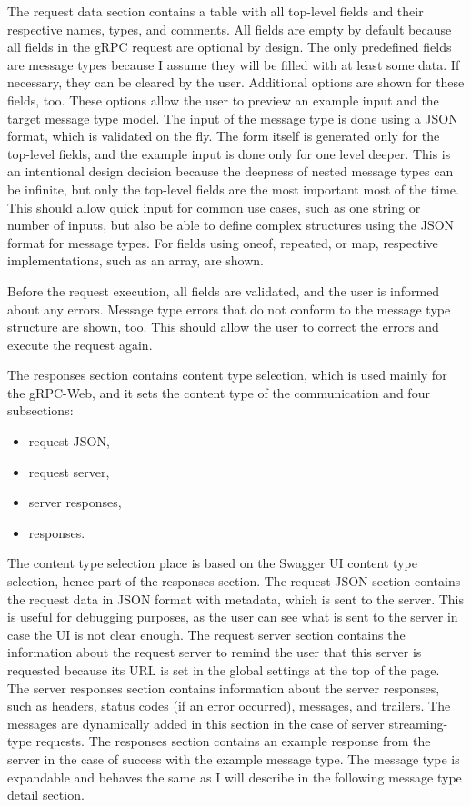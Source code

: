 The request data section contains a table with all top-level fields and their respective names, types, and comments.
All fields are empty by default because all fields in the gRPC request are optional by design.
The only predefined fields are message types because I assume they will be filled with at least some data.
If necessary, they can be cleared by the user.
Additional options are shown for these fields, too.
These options allow the user to preview an example input and the target message type model.
The input of the message type is done using a JSON format, which is validated on the fly.
The form itself is generated only for the top-level fields, and the example input is done only for one level deeper.
This is an intentional design decision because the deepness of nested message types can be infinite, but only the top-level fields are the most important most of the time.
This should allow quick input for common use cases, such as one string or number of inputs, but also be able to define complex structures using the JSON format for message types.
For fields using oneof, repeated, or map, respective implementations, such as an array, are shown.

Before the request execution, all fields are validated, and the user is informed about any errors.
Message type errors that do not conform to the message type structure are shown, too.
This should allow the user to correct the errors and execute the request again.

The responses section contains content type selection, which is used mainly for the gRPC-Web, and it sets the content type of the communication and four subsections:
\begin{itemize}
    \item request JSON,
    \item request server,
    \item server responses,
    \item responses.
\end{itemize}

The content type selection place is based on the Swagger UI content type selection, hence part of the responses section.
The request JSON section contains the request data in JSON format with metadata, which is sent to the server.
This is useful for debugging purposes, as the user can see what is sent to the server in case the UI is not clear enough.
The request server section contains the information about the request server to remind the user that this server is requested because its URL is set in the global settings at the top of the page.
The server responses section contains information about the server responses, such as headers, status codes (if an error occurred), messages, and trailers.
The messages are dynamically added in this section in the case of server streaming-type requests.
The responses section contains an example response from the server in the case of success with the example message type.
The message type is expandable and behaves the same as I will describe in the following message type detail section.


